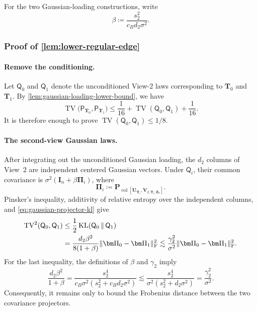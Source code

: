 \documentclass[11pt]{article}
\begin{document}
For the two Gaussian-loading constructions, write
\begin{equation}
  \beta
  \coloneqq
  \frac{s_2^2}{c_Bd_2\sigma^2}.
\label{eq:lower-gaussian-loading-beta}
\end{equation}


\subsubsection{Proof of \cref{lem:lower-regular-edge}}


\paragraph{Remove the conditioning.}
Let $\mathsf Q_0$ and $\mathsf Q_1$ denote the unconditioned View-2 laws
corresponding to $\bm T_0$ and $\bm T_1$.  By
\cref{lem:gaussian-loading-lower-bound}, we have 
\[
  \operatorname{TV}\bigl(
    \mathsf P_{\bm T_0},
    \mathsf P_{\bm T_1}
  \bigr)
  \le
  \frac1{16}
  +
  \operatorname{TV}(\mathsf Q_0,\mathsf Q_1)
  +
  \frac1{16}.
\]
It is therefore enough to prove
$\operatorname{TV}(\mathsf Q_0,\mathsf Q_1)\le1/8$. 


\paragraph{The second-view Gaussian laws.}

After integrating out the unconditioned Gaussian loading, the $d_2$ columns
of View~2 are independent centered Gaussian vectors.  Under $\mathsf Q_i$,
their common covariance is
$\sigma^2(\bm I_n+\beta\bm\Pi_i)$, where
\[
  \bm\Pi_i
  \coloneqq
  \bm P_{\operatorname{col}
  [\bm U_{\bm T_i},\bm V_{2,\bm T_i,\bm Z_0}]}.
\]
Pinsker's inequality, additivity of relative entropy over the independent
columns, and \cref{eq:gaussian-projector-kl} give
\begin{align}
  \operatorname{TV}^2(\mathsf Q_0,\mathsf Q_1)
  &\le
  \frac12
  \operatorname{KL}(\mathsf Q_0\,\|\,\mathsf Q_1)
  \notag\\
  &=
  \frac{d_2\beta^2}{8(1+\beta)}
  \|\bm\Pi_0-\bm\Pi_1\|_{\mathrm F}^2
  \lesssim
  \frac{\gamma_2^2}{\sigma^2}
  \|\bm\Pi_0-\bm\Pi_1\|_{\mathrm F}^2.
  \label{eq:lower-regular-TV-projector-reduction}
\end{align}
For the last inequality, the definitions of $\beta$ and $\gamma_2$ imply
\[
  \frac{d_2\beta^2}{1+\beta}
  =
  \frac{s_2^4}
       {c_B\sigma^2(s_2^2+c_Bd_2\sigma^2)}
  \lesssim
  \frac{s_2^4}
       {\sigma^2(s_2^2+d_2\sigma^2)}
  =
  \frac{\gamma_2^2}{\sigma^2}.
\]
Consequently, it remains only to bound the Frobenius distance between the
two covariance projectors.
\end{document}
